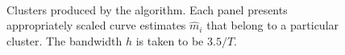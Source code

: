 \documentclass[a4paper,12pt]{article}
\numberwithin{equation}{section}
\begin{document}
\begin{figure}
\\
\hspace{0.25cm}
\caption{Clusters produced by the algorithm. Each panel presents appropriately scaled curve estimates $\hat{m}_i$ that belong to a particular cluster. The bandwidth $h$ is taken to be $3.5/T$.}\label{fig:clusters}
\end{figure}
\end{document}
